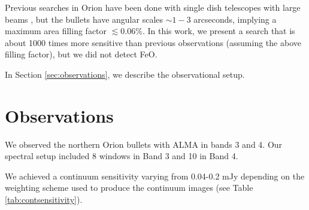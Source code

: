 Previous searches in Orion have been done with single dish telescopes with
large beams \citep[40\arcsec;][]{Merer1982a}, but the bullets have angular
scales $\sim1-3$ arcseconds, implying a maximum area filling factor
$\lesssim0.06\%$.  In this work, we present a search that is about 1000 times more
sensitive than previous observations (assuming the above filling factor),
but we did not detect FeO.

In Section \ref{sec:observations}, we describe the observational setup.


\section{Observations}

We observed the northern Orion bullets with ALMA in bands 3 and 4.
Our spectral setup included 8 windows in Band 3 and 10 in Band 4.


We achieved a continuum sensitivity varying from 0.04-0.2 mJy depending on the
weighting scheme used to produce the continuum images (see Table
\ref{tab:contsensitivity}).




